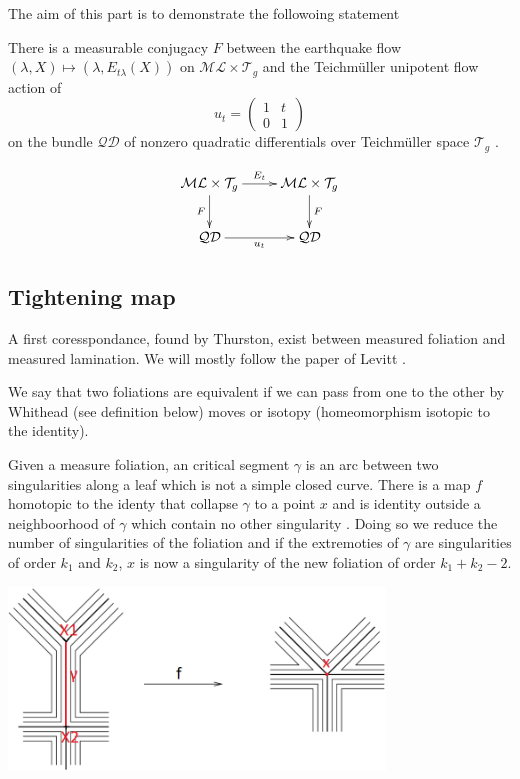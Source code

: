 The aim of this part is to demonstrate the followoing statement

\begin{thm}
There is a measurable conjugacy $F$ between the earthquake flow $(\lambda , X) \mapsto (\lambda, E_{t \lambda}(X))$ on $\mathcal{ML}\times \mathcal{T}_g $ and the Teichmüller unipotent flow action of \[
u_t = \begin{pmatrix} 1 & t \\ 0 & 1 \end{pmatrix}
\]
on the bundle $\mathcal{QD}$ of nonzero quadratic differentials over Teichmüller space $\mathcal{T}_g$ .
\end{thm}

\[
\xymatrix{
  \mathcal{ML}\times \mathcal{T}_g  \ar[r]^{E_t} \ar[d]_F  & \mathcal{ML}\times \mathcal{T}_g \ar[d]^F \\
   \mathcal{QD} \ar[r]_{u_t} & \mathcal{QD}
 }
\]

\subsection{Tightening map}%

A first coresspondance, found by Thurston, exist between measured foliation and measured lamination. We will mostly follow the paper of Levitt \cite{levittfoliations}.

\begin{dfnt}
We say that two foliations are equivalent if we can pass from one to the other by Whithead (see definition below) moves or isotopy (homeomorphism isotopic to the identity).
\end{dfnt}


\begin{dfnt}
Given a measure foliation, an critical segment $\gamma$ is an arc between two singularities along a leaf which is not a simple closed curve.
There is a map $f$ homotopic to the identy that collapse $\gamma$ to a point $x$ and is identity outside a neighboorhood of $\gamma$ which contain no other singularity .  Doing so we reduce the number of singularities of the foliation and if the extremoties of $\gamma$ are singularities of order $k_1$ and $k_2$, $x$ is now a singularity of the new foliation of order $k_1+k_2-2$.
\end{dfnt}


\begin{center}
\includegraphics[width=10cm]{Image/Whitehead-move-collapsing-or-creating-an-arc-joining-two-singular-points.png}
\end{center}

